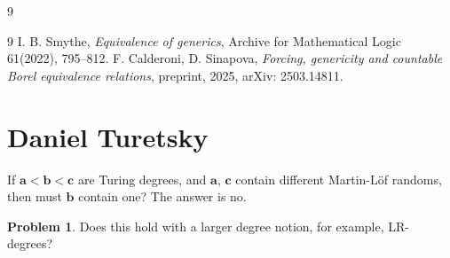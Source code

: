 \documentclass[11pt]{amsart}
\theoremstyle{definition}
\newtheorem{problem}{Problem}[section]
\begin{document}
\vskip -10pt
\begin{bibentry}{9}
\begin{thebibliography}{9}
I. B. Smythe, \textit{Equivalence of generics}, Archive for Mathematical Logic 61(2022), 795--812.
 F. Calderoni, D. Sinapova, \textit{Forcing, genericity and countable Borel equivalence relations}, preprint, 2025, arXiv: 2503.14811.
\end{thebibliography}
\end{bibentry}































\bigskip
\bigskip



\section{Daniel Turetsky}
\quad If $\mathbf{a}<\mathbf{b}<\mathbf{c}$ are Turing degrees, and $\mathbf{a}$, $\mathbf{c}$ contain different Martin-L\"of randoms, then must $\mathbf{b}$ contain one? The answer is no.
\begin{problem}
    Does this hold with a larger degree notion, for example, LR-degrees?
\end{problem}























\bigskip
\bigskip
\end{document}
